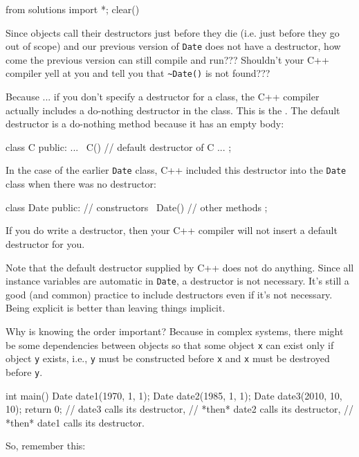\begin{python0}
from solutions import *; clear()
\end{python0}

Since objects call their destructors just before they die (i.e. just
before they go out of scope) and our previous version of \texttt{Date}
does not have a destructor, how come the previous version can still
compile and run??? Shouldn't your C++ compiler yell at
you and tell you that \texttt{\~{}Date()} is not found???


Because ... if you don't specify a destructor for a
class, the C++ compiler actually includes a do-nothing destructor in the
class. This is the . The default destructor
is a do-nothing method because it has an empty body:

\begin{consolethree}[escapeinside=||]
class C
{
public:
    ...
    ~C() {} // default destructor of C
    ...
};
\end{consolethree}

In the case of the earlier \texttt{Date} class, C++ included this
destructor into the \texttt{Date} class when there was no destructor:

\begin{consolethree}[escapeinside=||]
class Date
{
public:
    // constructors
    ~Date() {}
    // other methods
};
\end{consolethree}

If you do write a destructor, then your C++ compiler will not insert a
default destructor for you.

Note that the default destructor supplied by C++ does not do anything.
Since all instance variables are automatic in \texttt{Date}, a destructor
is not necessary. It's still a good (and common)
practice to include destructors
even if it's not necessary. Being explicit is better
than leaving things implicit.


Why is knowing the order important? Because in complex systems, there
might be some dependencies between objects so that some object \texttt{x}
can exist only if object \texttt{y} exists, i.e., \texttt{y} must be
constructed before \texttt{x} and \texttt{x} must be destroyed before
\texttt{y}.

\begin{consolethree}[escapeinside=||]
int main()
{
    Date date1(1970, 1, 1);
    Date date2(1985, 1, 1);
    Date date3(2010, 10, 10);
    return 0; // date3 calls its destructor,
              // *then* date2 calls its destructor,
              // *then* date1 calls its destructor.
}
\end{consolethree}

So, remember this: 








